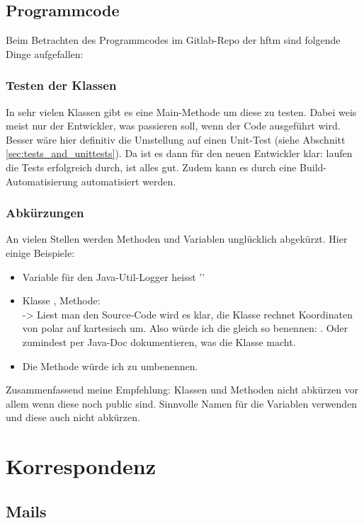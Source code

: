 \section{Programmcode}
Beim Betrachten des Programmcodes im Gitlab-Repo der \acrshort{hftm} sind folgende Dinge aufgefallen:
\subsection{Testen der Klassen}
In sehr vielen Klassen gibt es eine Main-Methode um diese zu testen. Dabei weis meist nur der Entwickler, was passieren soll, wenn der Code ausgeführt wird. Besser wäre hier definitiv die Umstellung auf einen Unit-Test (siehe Abschnitt \ref{sec:tests_and_unittests}). Da ist es dann für den neuen Entwickler klar: laufen die Tests erfolgreich durch, ist alles gut. Zudem kann es durch eine Build-Automatisierung automatisiert werden.

\subsection{Abkürzungen}
An vielen Stellen werden Methoden und Variablen unglücklich abgekürzt. Hier einige Beispiele:
\begin{itemize}
	\item Variable für den Java-Util-Logger heisst ''
	\item Klasse , Methode:  \\ -> Liest man den Source-Code wird es klar, die Klasse rechnet Koordinaten von polar auf kartesisch um. Also würde ich die gleich so benennen: . Oder zumindest per Java-Doc dokumentieren, was die Klasse macht.
	\item Die Methode  würde ich zu  umbenennen.
\end{itemize}
Zusammenfassend meine Empfehlung: Klassen und Methoden nicht abkürzen vor allem wenn diese noch public sind. Sinnvolle Namen für die Variablen verwenden und diese auch nicht abkürzen.

\chapter{Korrespondenz}
\section{Mails}
